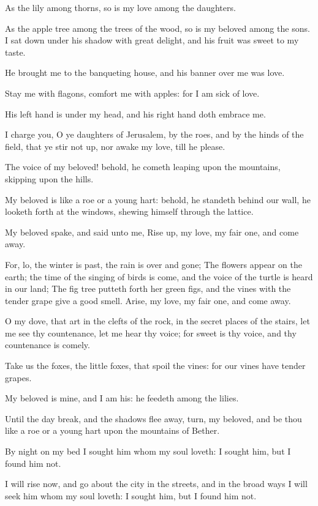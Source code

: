 \Verse As the lily among thorns, so is my love among the daughters.

\Verse As the apple tree among the trees of the wood, so is my beloved among the sons. I sat down under his shadow with great delight, and his fruit was sweet to my taste.

\Verse He brought me to the banqueting house, and his banner over me was love.

\Verse Stay me with flagons, comfort me with apples: for I am sick of love.

\Verse His left hand is under my head, and his right hand doth embrace me.

\Verse I charge you, O ye daughters of Jerusalem, by the roes, and by the hinds of the field, that ye stir not up, nor awake my love, till he please.

\Verse The voice of my beloved! behold, he cometh leaping upon the mountains, skipping upon the hills.

\Verse My beloved is like a roe or a young hart: behold, he standeth behind our wall, he looketh forth at the windows, shewing himself through the lattice.

\Verse My beloved spake, and said unto me, Rise up, my love, my fair one, and come away.

\Verse For, lo, the winter is past, the rain is over and gone; \Verse The flowers appear on the earth; the time of the singing of birds is come, and the voice of the turtle is heard in our land; \Verse The fig tree putteth forth her green figs, and the vines with the tender grape give a good smell. Arise, my love, my fair one, and come away.

\Verse O my dove, that art in the clefts of the rock, in the secret places of the stairs, let me see thy countenance, let me hear thy voice; for sweet is thy voice, and thy countenance is comely.

\Verse Take us the foxes, the little foxes, that spoil the vines: for our vines have tender grapes.

\Verse My beloved is mine, and I am his: he feedeth among the lilies.

\Verse Until the day break, and the shadows flee away, turn, my beloved, and be thou like a roe or a young hart upon the mountains of Bether.


\Chapter
\Verse By night on my bed I sought him whom my soul loveth: I sought him, but I found him not.

\Verse I will rise now, and go about the city in the streets, and in the broad ways I will seek him whom my soul loveth: I sought him, but I found him not.

